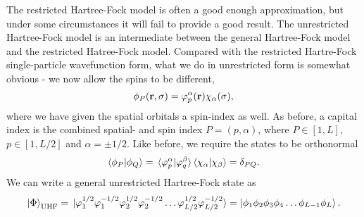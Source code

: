 The restricted Hartree-Fock model is often a good enough approximation, but under some 
circumstances it will fail to provide a good result. The unrestricted Hartree-Fock model 
is an intermediate between the general Hartree-Fock model and the restricted Hatree-Fock 
model. Compared with the restricted Hartre-Fock single-particle wavefunction form, what we do 
in unrestricted form is somewhat obvious - we now allow the spins to be different,
\begin{equation}
    \phi_P(\vb{r}, \sigma) = \varphi_p^{\alpha}(\vb{r})\chi_\alpha(\sigma),
\end{equation}
where we have given the spatial orbitals a spin-index as well. As before, a capital index 
is the combined spatial- and spin index $P=(p,\alpha)$, where $P \in [1,L]$, $p\in [1, L/2]$
and $\alpha = \pm 1/2$. 
Like before, we require the states to be orthonormal 
\begin{equation}
    \braket{\phi_P}{\phi_Q} 
    = \braket*{\varphi^\alpha_p}{\varphi^\beta_q}\braket{\chi_\alpha}{\chi_\beta}
    = \delta_{PQ}.
\end{equation}
We can write a general unrestricted Hartree-Fock state as 
\begin{equation}
    \ket{\Phi}_{\text{UHF}}
        =
        \ket*{\varphi_1^{1/2} \varphi_1^{-1/2} \varphi_2^{1/2} \varphi_2^{-1/2}
            \dots \varphi_{L/2}^{1/2} \varphi_{L/2}^{-1/2}}
        =
        \ket{\phi_1\phi_2\phi_3\phi_4 \dots \phi_{L-1} \phi_L}.
\end{equation}

